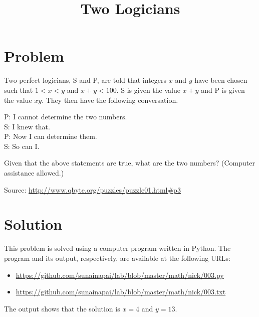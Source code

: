 \documentclass{article}
\title{Two Logicians}
\begin{document}
\maketitle


\section*{Problem}
Two perfect logicians, S and P, are told that integers \( x \) and \( y \)
have been chosen such that \( 1 < x < y \) and \( x + y < 100 \). S is
given the value \( x + y \) and P is given the value \( xy \). They then
have the following conversation.

\setlength{\leftskip}{2em}
P:  I cannot determine the two numbers. \\
S:  I knew that. \\
P:  Now I can determine them. \\
S:  So can I.
\setlength{\leftskip}{0em}

Given that the above statements are true, what are the two numbers?
(Computer assistance allowed.)

Source: \url{http://www.qbyte.org/puzzles/puzzle01.html#p3}


\section*{Solution}
This problem is solved using a computer program written in Python. The
program and its output, respectively, are available at the following
URLs:
\begin{itemize}
\item \url{https://github.com/sunainapai/lab/blob/master/math/nick/003.py}
\item \url{https://github.com/sunainapai/lab/blob/master/math/nick/003.txt}
\end{itemize}

The output shows that the solution is \( x = 4 \) and \( y = 13 \).
\end{document}
